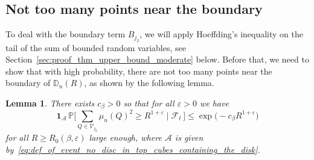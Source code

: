 \documentclass[11pt]{amsart}
\newtheorem{lemma}[theorem]{Lemma}
\theoremstyle{definition}
\theoremstyle{remark}
\numberwithin{equation}{section}
\def\eps{{\varepsilon}}
\newcommand{\bD}{\mathbb D}
\newcommand{\bP}{\mathbb P}
\begin{document}
	\subsection{Not too many points near the boundary}
	To deal with the boundary term $B_{j_2}$, we will apply Hoeffding's inequality on the tail of the sum of bounded random variables, see Section~\ref{sec:proof_thm_upper_bound_moderate} below. Before that, we need to show that with high probability, there are not too many points near the boundary of $\bD_n(R)$, as shown by the following lemma.
	\begin{lemma}
		\label{lemma:cramer_estimate_on_the_boundary}
		There exists $c_\beta>0$ so that for all $\eps>0$ we have
		\[
		\mathbf{1}_{\mathcal{A}} \, \bP\Big[\sum_{Q\in \mathcal{V}_{j_2}} \mu_n(Q)^2 \ge R^{1+\eps} \mid \mathcal{F}_\ell \, \Big] \le \exp\Big(-c_\beta R^{1+\eps}\Big)
		\]
		for all $R\ge R_0(\beta,\eps)$ large enough, where $\mathcal{A}$ is given by~\eqref{eq:def_of_event_no_disc_in_top_cubes_containing_the_disk}.
	\end{lemma}
\end{document}
